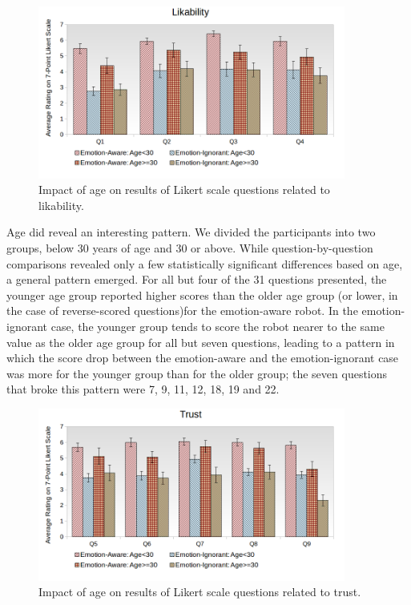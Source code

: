\documentclass[12pt]{report}
\begin{document}
\begin{figure}[tbh]
\centering
\includegraphics[width=0.9\textwidth]{figure/Age-Likability.png}
\vspace*{-5mm}
\caption{\fontsize{10pt}{10pt}\selectfont Impact of age on results of Likert
scale questions related to likability.}
\label{fig:age-likability}
\end{figure}

Age did reveal an interesting pattern. We divided the participants into two
groups, below 30 years of age and 30 or above. While question-by-question
comparisons revealed only a few statistically significant differences based on
age, a general pattern emerged. For all but four of the 31 questions presented,
the younger age group reported higher scores than the older age group (or lower,
in the case of reverse-scored questions)for the emotion-aware robot. In the
emotion-ignorant case, the younger group tends to score the robot nearer to
the same value as the older age group for all but seven questions, leading to a
pattern in which the score drop between the emotion-aware and the
emotion-ignorant case was more for the younger group than for the older group;
the seven questions that broke this pattern were 7, 9, 11, 12, 18, 19 and 22.

\begin{figure}[!h]
\centering
\includegraphics[width=0.9\textwidth]{figure/Age-Trust.png}
\caption{\fontsize{10pt}{10pt}\selectfont Impact of age on results of Likert
scale questions related to trust.}
\label{fig:age-trust}
\end{figure}
\end{document}
